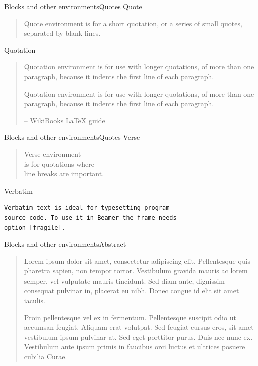 \documentclass[aspectratio=169, 11pt]{beamer}
\begin{document}
\begin{frame}{Blocks and other environments}{Quotes}
Quote 
\begin{quote}
	Quote environment is for a short quotation, or a series of small quotes, separated by blank lines.
\end{quote}

\vspace{11pt}
Quotation 
\begin{quotation}
	Quotation environment is for use with longer quotations, of more than one paragraph, because it indents the first line of each paragraph. 

	Quotation environment is for use with longer quotations, of more than one paragraph, because it indents the first line of each paragraph.
	
	\raggedleft	\normalfont --  WikiBooks \LaTeX$ $ guide
\end{quotation}
\end{frame}


\begin{frame}[fragile]{Blocks and other environments}{Quotes}
Verse
\begin{verse}
	Verse environment \\ 
	is for quotations where \\
	line breaks are important. 
\end{verse}

\vspace{11pt}
Verbatim
\begin{verbatim}
Verbatim text is ideal for typesetting program
source code. To use it in Beamer the frame needs
option [fragile].
\end{verbatim}
\end{frame}


\begin{frame}{Blocks and other environments}{Abstract}
\vspace{15pt}
\begin{abstract}
	Lorem ipsum dolor sit amet, consectetur adipiscing elit. Pellentesque quis pharetra sapien, non tempor tortor. Vestibulum gravida mauris ac lorem semper, vel vulputate mauris tincidunt. Sed diam ante, dignissim consequat pulvinar in, placerat eu nibh. Donec congue id elit sit amet iaculis.
	
	Proin pellentesque vel ex in fermentum. Pellentesque suscipit odio ut accumsan feugiat. Aliquam erat volutpat. Sed feugiat cursus eros, sit amet vestibulum ipsum pulvinar at. Sed eget porttitor purus. Duis nec nunc ex. Vestibulum ante ipsum primis in faucibus orci luctus et ultrices posuere cubilia Curae.
\end{abstract}
\end{frame}
\end{document}
